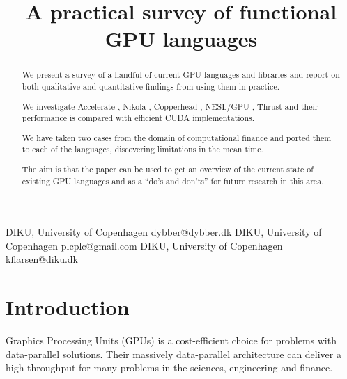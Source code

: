 \documentclass[preprint]{sigplanconf}
\begin{document}
\copyrightdata{[to be supplied]} 


\title{A practical survey of functional GPU languages}

           {DIKU, University of Copenhagen}
           {dybber@dybber.dk}
           {DIKU, University of Copenhagen}
           {plcplc@gmail.com}
           {DIKU, University of Copenhagen}
           {kflarsen@diku.dk}

\maketitle

\begin{abstract}
  We present a survey of a handful of current GPU languages and
  libraries and report on both qualitative and quantitative findings
  from using them in practice.

  We investigate Accelerate \cite{chakravarty2011accelerating}, Nikola
  \cite{mainland2010nikola}, Copperhead \cite{Catanzaro2011}, NESL/GPU
  \cite{bergstrom2012nested}, Thrust \cite{Thrust} and their
  performance is compared with efficient CUDA implementations.

  We have taken two cases from the domain of computational finance and
  ported them to each of the languages, discovering limitations in the
  mean time.

  The aim is that the paper can be used to get an overview of the
  current state of existing GPU languages and as a ``do's and don'ts''
  for future research in this area.
\end{abstract}




\section{Introduction}
Graphics Processing Units (GPUs) is a cost-efficient choice for
problems with data-parallel solutions. Their massively data-parallel
architecture can deliver a high-throughput for many problems in the
sciences, engineering and finance.
\end{document}
